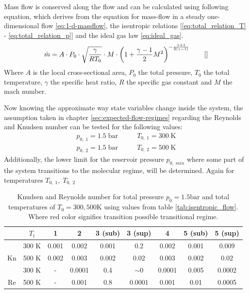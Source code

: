 	
	Mass flow is conserved along the flow and can be calculated using following equation, which derives from the equation for mass-flow in a steady one-dimensional flow \eqref{eq:1-d-massflow}, the isentropic relations [\eqref{eq:total_relation_T} - \eqref{eq:total_relation_p}] and the ideal gas law \eqref{eq:ideal_gas}.
	\cite{benson_mass_nodate}
	$$
		\dot{m} = A \cdot P_0 \cdot \sqrt{\frac{\gamma}{R T_0}} \cdot M \cdot \left(1 + \frac{\gamma - 1}{2} M^2\right)^{-\frac{\gamma + 1}{2(\gamma - 1)}}
		\qquad \eqref{}
	$$
	Where $A$ is the local cross-sectional area, $P_0$ the total pressure, $T_0$ the total temperature, $\gamma$ the specific heat ratio, $R$ the specific gas constant and $M$ the mach number.
	\cite{Cantwell_AA210A}

	Now knowing the approximate way state variables change inside the system, the assumption taken in chapter \ref{sec:expected-flow-regimes} regarding the Reynolds and Knudsen number can be tested for the following values:
	\begin{align*}
		p_{0,\;1} = 1.5\;\text{bar} &\qquad T_{0,\;1} = 300\;\text{K}\\
		p_{0,\;2} = 1.5\;\text{bar} &\qquad T_{0,\;2} = 500\;\text{K}
	\end{align*}
	Additionally, the lower limit for the reservoir pressure $p_{0,\;min}$ where some part of the system transitions to the molecular regime, will be determined.
	Again for temperatures $T_{0,\;1},\;T_{0,\;2}$
	\begin{table}[H]
		\centering
		\begin{tabular}{|c|c|c|c|c|c|c|c|c|}
		\hline
		 & $T_t$ & 1 & 2 & 3 (sub) & 3 (sup) & 4 & 5 (sub) & 5 (sup) \\ \hline
		 & 300 K & 0.001 & 0.002 & 0.001 & \cellcolor[HTML]{FFADA8}0.2 & 0.002 & 0.001 & 0.009 \\
		\multirow{-2}{*}{Kn} & 500 K & 0.002 & 0.003 & 0.002 & 0.02 & 0.003 & 0.002 & 0.02 \\ \hline
	     & 300 K & - & 0.0001 & 0.4 & $\sim$0 & 0.0001 & 0.005 & 0.0002  \\
		\multirow{-2}{*}{Re} & 500 K & - & 0.001 & 0.8 & 0.0001 & 0.001 & 0.01 & 0.0005 \\ \hline 
		\end{tabular}
		\caption{Knudsen and Reynolds number for total pressure $p_0 = 1.5 \text{bar}$ and total temperatures of $T_0 = 300, 500 \text{K}$ using values from table \ref{tab:isentropic_flow}. Where red color signifies transition possible transitional regime.}
		\label{tab:knudsen-reynolds-isentropic}
	\end{table}
